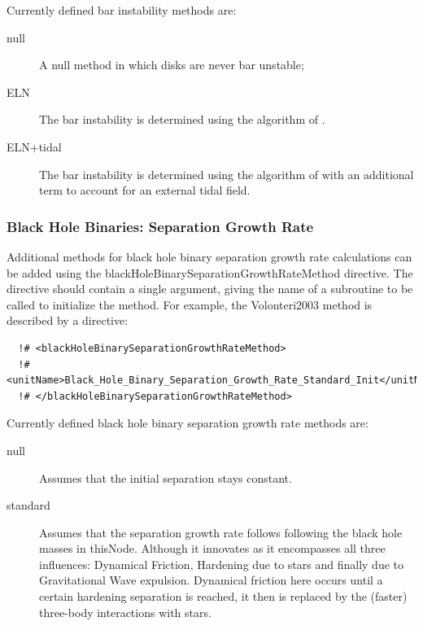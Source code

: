 Currently defined bar instability methods are:
\begin{description}
 \item [{\normalfont \ttfamily null}] A null method in which disks are never bar unstable;
 \item [{\normalfont \ttfamily ELN}] The bar instability is determined using the algorithm of \cite{efstathiou_stability_1982}.
 \item [{\normalfont \ttfamily ELN+tidal}] The bar instability is determined using the algorithm of \cite{efstathiou_stability_1982} with an additional term to account for an external tidal field.
\end{description}

\subsubsection{Black Hole Binaries: Separation Growth Rate}\label{sec:SMBHRadialMotion}

Additional methods for black hole binary separation growth rate calculations can be added using the {\normalfont \ttfamily blackHoleBinarySeparationGrowthRateMethod} directive. The directive should contain a single argument, giving the name of a subroutine to be called to initialize the method. For example, the {\normalfont \ttfamily Volonteri2003} method is described by a directive:

\begin{verbatim}
  !# <blackHoleBinarySeparationGrowthRateMethod>
  !#  <unitName>Black_Hole_Binary_Separation_Growth_Rate_Standard_Init</unitName>
  !# </blackHoleBinarySeparationGrowthRateMethod>
\end{verbatim}

Currently defined black hole binary separation growth rate methods are:
\begin{description}
 \item [{\normalfont \ttfamily null}] Assumes that the initial separation stays constant.
 \item [{\normalfont \ttfamily standard}] Assumes that the separation growth rate follows \cite{volonteri_assembly_2003} following the black hole masses in {\normalfont \ttfamily thisNode}. Although it innovates as it encompasses all three influences: Dynamical Friction, Hardening due to stars and finally due to Gravitational Wave expulsion. Dynamical friction here occurs until a certain hardening separation is reached, it then is replaced by the (faster) three-body interactions with stars.
\end{description}

